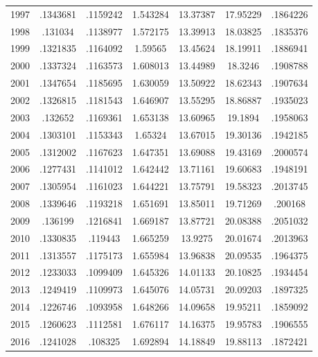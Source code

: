 {\begin{longtable}{l*{1}{cccccc}}
1997        &    .1343681&    .1159242&    1.543284&    13.37387&    17.95229&    .1864226\\
1998        &     .131034&    .1138977&    1.572175&    13.39913&    18.03825&    .1835376\\
1999        &    .1321835&    .1164092&     1.59565&    13.45624&    18.19911&    .1886941\\
2000        &    .1337324&    .1163573&    1.608013&    13.44989&     18.3246&    .1908788\\
2001        &    .1347654&    .1185695&    1.630059&    13.50922&    18.62343&    .1907634\\
2002        &    .1326815&    .1181543&    1.646907&    13.55295&    18.86887&    .1935023\\
2003        &     .132652&    .1169361&    1.653138&    13.60965&     19.1894&    .1958063\\
2004        &    .1303101&    .1153343&     1.65324&    13.67015&    19.30136&    .1942185\\
2005        &    .1312002&    .1167623&    1.647351&    13.69088&    19.43169&    .2000574\\
2006        &    .1277431&    .1141012&    1.642442&    13.71161&    19.60683&    .1948191\\
2007        &    .1305954&    .1161023&    1.644221&    13.75791&    19.58323&    .2013745\\
2008        &    .1339646&    .1193218&    1.651691&    13.85011&    19.71269&     .200168\\
2009        &     .136199&    .1216841&    1.669187&    13.87721&    20.08388&    .2051032\\
2010        &    .1330835&     .119443&    1.665259&     13.9275&    20.01674&    .2013963\\
2011        &    .1313557&    .1175173&    1.655984&    13.96838&    20.09535&    .1964375\\
2012        &    .1233033&    .1099409&    1.645326&    14.01133&    20.10825&    .1934454\\
2013        &    .1249419&    .1109973&    1.645076&    14.05731&    20.09203&    .1897325\\
2014        &    .1226746&    .1093958&    1.648266&    14.09658&    19.95211&    .1859092\\
2015        &    .1260623&    .1112581&    1.676117&    14.16375&    19.95783&    .1906555\\
2016        &    .1241028&     .108325&    1.692894&    14.18849&    19.88113&    .1872421\\

\end{longtable}}
